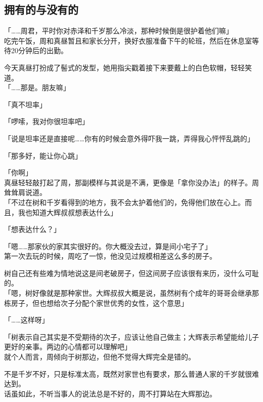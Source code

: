 \subsection{拥有的与没有的}

「……周君，平时你对赤泽和千岁那么冷淡，那种时候倒是很护着他们嘛」\\

吃完午饭，周和真昼暂且和家长分开，换好衣服准备下午的轮班，然后在休息室等待20分钟后的出勤。

今天真昼打扮成了髻式的发型，她用指尖戳着接下来要戴上的白色软帽，轻轻笑道。\\

「……那是。朋友嘛」

「真不坦率」

「啰嗦，我对你很坦率吧」

「说是坦率还是直接呢……你有的时候会意外得吓我一跳，弄得我心怦怦乱跳的」

「那多好，能让你心跳」

「你啊」\\

真昼轻轻敲打起了周，那副模样与其说是不满，更像是「拿你没办法」的样子。周耸耸肩说道。\\

「不过在树和千岁看得到的地方，我不会太护着他们的，免得他们放在心上。而且，我也知道大辉叔叔想表达什么」

「想表达什么？」

「嗯……那家伙的家其实很好的。你大概没去过，算是间小宅子了」\\

第一次去玩的时候，周吃了一惊，他没见过规模相差这么多的房子。

树自己还有些难为情地说这是间老破房子，但这间房子应该很有来历，没什么可耻的。\\

「嗯，树好像就是那种家世。大辉叔叔大概是说，虽然树有个成年的哥哥会继承那栋房子，但也想给次子分配个家世优秀的女性，这个意思」

「……这样呀」

「树表示自己其实是不受期待的次子，应该让他自己做主；大辉表示希望能给儿子更好的亲事。两边的心情都可以理解吧」\\

就个人而言，周倾向于树那边，但他不觉得大辉完全是错的。

不是千岁不好，只是标准太高，既然对家世也有要求，那么普通人家的千岁就很难达到。\\

话虽如此，不听当事人的说法总是不好的，周不打算站在大辉那边。\\

